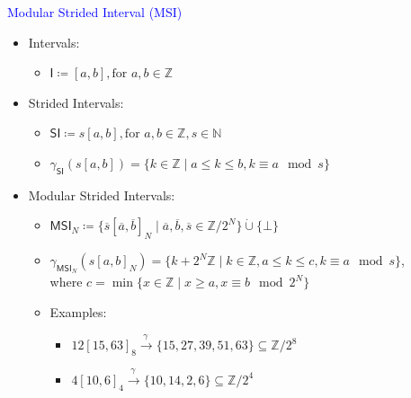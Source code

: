 \begin{frame}[fragile]{\textcolor{blue}{Modular Strided Interval (MSI)}}
\begin{itemize}

\item Intervals:
\begin{itemize}
\item $\mathsf{I} \coloneqq [a,b], \text{for } a,b \in \mathbb{Z}$
\end{itemize}
\item Strided Intervals:
\begin{itemize}
\item $\mathsf{SI} \coloneqq s[a,b], \text{for } a,b \in \mathbb{Z}, s \in \mathbb{N}$
\item $\gamma_{\mathsf{SI}}(s[a,b]) = \{k \in \mathbb{Z} \mid
a \leq k \leq b, k \equiv a \mod s \}$
\end{itemize}
\item Modular Strided Intervals:
\begin{itemize}
\item $\mathsf{MSI}_{N} \coloneqq \{\overline{s}[\overline{a},\overline{b}]_N \mid \overline{a}, \overline{b}, \overline{s} \in \mathbb{Z}/2^N \} \dot\cup \{\bot\}$
\item $\gamma_{\mathsf{MSI}_N}(s[a,b]_N) = \{k + 2^N\mathbb{Z} \mid
k \in \mathbb{Z}, a \leq k \leq c, k \equiv a \mod s \}$, \\ where $c = \min\{x \in \mathbb{Z} \mid x \geq a, x \equiv b \mod 2^N \}$
\item Examples:
\begin{itemize}
\item $12[15,63]_8 \stackrel{\gamma~}{\rightarrow}\{15,27,39,51,63\} \subseteq \mathbb{Z}/2^8$
\item $4[10,6]_4 \stackrel{\gamma~}{\rightarrow}\{10,14,2,6\} \subseteq \mathbb{Z}/2^4$

\end{itemize}
\end{itemize}
\end{itemize}

\end{frame}


